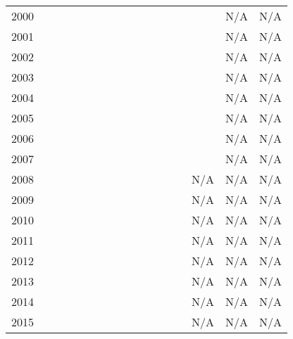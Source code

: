 \begin{center}
\begin{tabular}{c|cccccccccccccccc}
        2000 &       &       &       &       &       &       &       &       &    &    &       &       &       &     & N/A & N/A \\
        2001 &       &       &       &       &       &       &       &       &    &    &       &       &       &     & N/A & N/A \\
        2002 &       &       &       &       &       &       &       &       &    &    &       &       &       &     & N/A & N/A \\
        2003 &       &       &       &       &       &       &       &       &    &    &       &       &       &     & N/A & N/A \\
        2004 &       &       &       &       &       &       &       &       &    &    &       &       &       &     & N/A & N/A \\
        2005 &       &       &       &       &       &       &       &       &    &    &       &       &       &     & N/A & N/A \\
        2006 &       &       &       &       &       &       &       &       &    &    &       &       &       &     & N/A & N/A \\
        2007 &       &       &       &       &       &       &       &       &    &    &       &       &       &     & N/A & N/A \\
        2008 &       &       &       &       &       &       &       &       &    &    &       &       &       & N/A & N/A & N/A \\
        2009 &       &       &       &       &       &       &       &       &    &    &       &       &       & N/A & N/A & N/A \\
        2010 &       &       &       &       &       &       &       &       &    &    &       &       &       & N/A & N/A & N/A \\
        2011 &       &       &       &       &       &       &       &       &    &    &       &       &       & N/A & N/A & N/A \\
        2012 &       &       &       &       &       &       &       &       &    &    &       &       &       & N/A & N/A & N/A \\
        2013 &       &       &       &       &       &       &       &       &    &    &       &       &       & N/A & N/A & N/A \\
        2014 &       &       &       &       &       &       &       &       &    &    &       &       &       & N/A & N/A & N/A \\
        2015 &       &       &       &       &       &       &       &       &    &    &       &       &       & N/A & N/A & N/A \\

\end{tabular}
\end{center}
